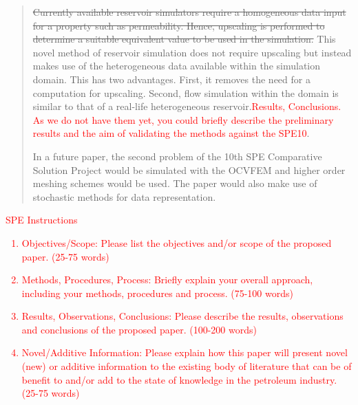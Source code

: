 \documentclass{article}
\newcommand{\red}{\textcolor{red}}
\begin{document}
\begin{abstract}
\sout{Currently available reservoir simulators require a homogeneous data input for a property such as permeability. Hence, upscaling is performed to determine a suitable equivalent value to be used in the simulation.} This novel method of reservoir simulation does not require upscaling but instead makes use of the heterogeneous data available within the simulation domain. This has two advantages. First, it removes the need for a computation for upscaling. Second, flow simulation within the domain is similar to that of a real-life heterogeneous reservoir.\red{Results, Conclusions. As we do not have them yet, you could briefly describe the preliminary results and the aim of validating the methods against the SPE10}.

In a future paper, the second problem of the 10th SPE Comparative Solution Project would be simulated with the OCVFEM and higher order meshing schemes would be used. The paper would also make use of stochastic methods for data representation. 
\end{abstract}

\red{\begin{center}\large{SPE Instructions}\end{center}
\begin{enumerate}
  \item Objectives/Scope: Please list the objectives and/or scope of the proposed paper. (25-75 words)
  \item Methods, Procedures, Process: Briefly explain your overall approach, including your methods, procedures and process. (75-100 words)
  \item Results, Observations, Conclusions: Please describe the results, observations and conclusions of the proposed paper. (100-200 words)
  \item Novel/Additive Information: Please explain how this paper will present novel (new) or additive information to the existing body of literature that can be of benefit to and/or add to the state of knowledge in the petroleum industry. (25-75 words) 
\end{enumerate}}
\end{document}
